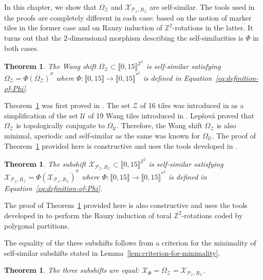 \documentclass[12pt]{amsart}
\newtheorem{theorem}[definition]{Theorem}
\newcommand{\Z}{\mathbb{Z}}
\newcommand{\Pcal}{\mathcal{P}}
\newcommand{\Ucal}{\mathcal{U}}
\newcommand{\Xcal}{\mathcal{X}} %
\newcommand{\Zcal}{\mathcal{Z}}
\newcommand{\shiftclosure}[1]{{\overline{#1}^{\sigma}}}
\newcommand{\Zrange}[1]{\llbracket0,#1\rrbracket}
\begin{document}
In this chapter, we show that $\Omega_\Zcal$ and $\Xcal_{\Pcal_\Zcal,R_\Zcal}$
are self-similar.
The tools used in the proofs are completely different in each case: based on the
notion of marker tiles in the former case and on Rauzy induction of
$\Z^2$-rotations in the latter.
It turns out that the $2$-dimensional morphism describing the self-similarities is
$\Phi$ in both cases.

\begin{theorem}\label{thm:main-theoremA}
    {\rm \cite{lepsova_thesis_2024}}
    The Wang shift $\Omega_\Zcal\subset\Zrange{15}^{\Z^2}$ is self-similar satisfying
    $\Omega_\Zcal=\shiftclosure{\Phi(\Omega_\Zcal)}$
    where $\Phi:\Zrange{15}\to\Zrange{15}^{*^2}$
    is defined in Equation~\eqref{eq:definition-of-Phi}.
\end{theorem}

Theorem~\ref{thm:main-theoremA} was first proved in \cite{lepsova_thesis_2024}.
The set $\Zcal$ of 16 tiles was introduced in \cite{lepsova_thesis_2024}
as a simplification of the set $\Ucal$ of 19 Wang tiles introduced in
\cite{MR3978536}. Lepšová proved that $\Omega_\Zcal$ is topologically conjugate
to $\Omega_\Ucal$. Therefore, the Wang shift $\Omega_\Zcal$ is also minimal,
 aperiodic and self-similar as the same was known for $\Omega_\Ucal$.
The proof of Theorem~\ref{thm:main-theoremA} provided here is constructive
and uses the tools developed in \cite{MR4226493}.

\begin{theorem}\label{thm:main-theoremB}
    The subshift $\Xcal_{\Pcal_\Zcal,R_\Zcal}\subset\Zrange{15}^{\Z^2}$ is self-similar satisfying 
    $\Xcal_{\Pcal_\Zcal,R_\Zcal}=\shiftclosure{\Phi(\Xcal_{\Pcal_\Zcal,R_\Zcal})}$
    where $\Phi:\Zrange{15}\to\Zrange{15}^{*^2}$
    is defined in Equation~\eqref{eq:definition-of-Phi}.
\end{theorem}

The proof of Theorem~\ref{thm:main-theoremB} provided here is also constructive
and uses the tools developed in \cite{MR4347332} to perform the Rauzy induction
of toral $\Z^2$-rotations coded by polygonal partitions.

The equality of the three subshifts follows from a criterion for the minimality
of self-similar subshifts stated in Lemma~\ref{lem:criterion-for-minimality}.


    \begin{theorem}\label{thm:equality-three-subshifts}
The three subshifts are equal:
$\Xcal_\Phi
=\Omega_\Zcal
=\Xcal_{\Pcal_\Zcal,R_\Zcal}$.
    \end{theorem}
\end{document}
